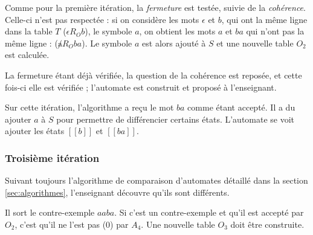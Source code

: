 \vspace{1cm}
Comme pour la première itération, la \emph{fermeture} est testée, suivie de la \emph{cohérence}. Celle-ci n'est pas respectée : si on considère les mots $\epsilon$ et $b$, qui ont la même ligne dans la table $T$ ($\epsilon R_O b$), le symbole $a$, on obtient les mots $a$ et $ba$ qui n'ont pas la même ligne : ($\not a R_O ba$). Le symbole $a$ est alors ajouté à $S$ et une nouvelle table $O_2$ est calculée.

La fermeture étant déjà vérifiée, la question de la cohérence est reposée, et cette fois-ci elle est vérifiée ; l'automate est construit et proposé à l'enseignant.

Sur cette itération, l'algorithme a reçu le mot $ba$ comme étant accepté. Il a du ajouter $a$ à $S$ pour permettre de différencier certains états. L'automate se voit ajouter les états $[[b]]$ et $[[ba]]$.

\subsubsection{Troisième itération}

Suivant toujours l'algorithme de comparaison d'automates détaillé dans la section \ref{sec:algorithmes}, l'enseignant découvre qu'ils sont différents. 

Il sort le contre-exemple $aaba$. Si c'est un contre-exemple et qu'il est accepté par $O_2$, c'est qu'il ne l'est pas (0) par $A_4$. Une nouvelle table $O_3$ doit être construite.

